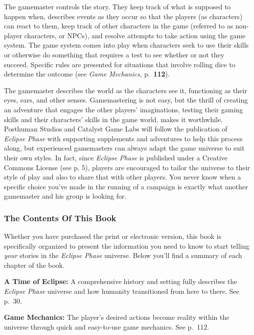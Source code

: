 The gamemaster controls the story. They keep track 
of what is supposed to happen when, describes events 
as they occur so that the players (as characters) can 
react to them, keep track of other characters in the 
game (referred to as non-player characters, or NPCs), 
and resolve attempts to take action using the game 
system. The game system comes into play when characters seek to use their skills or otherwise do something that requires a test to see whether or not they 
succeed. Specific rules are presented for situations that 
involve rolling dice to determine the outcome (see 
\textit{Game Mechanics,} p. \textbf{112}).

The gamemaster describes the world as the characters see it, functioning as their eyes, ears, and other 
senses. Gamemastering is not easy, but the thrill of 
creating an adventure that engages the other players' 
imaginations, testing their gaming skills and their 
characters' skills in the game world, makes it worthwhile. Posthuman Studios and Catalyst Game Labs 
will follow the publication of \textit{Eclipse Phase} with supporting supplements and adventures to help this process along, but experienced gamemasters can always 
adapt the game universe to suit their own styles. In 
fact, since \textit{Eclipse Phase} is published under a Creative 
Commons License (see p. 5), players are encouraged 
to tailor the universe to their style of play and also 
to share that with other players. You never know 
when a specific choice you've made in the running of 
a campaign is exactly what another gamemaster and 
his group is looking for.

\subsubsection{The Contents Of This Book}

Whether you have purchased the print or electronic 
version, this book is specifically organized to present 
the information you need to know to start telling 
\textit{your} stories in the \textit{Eclipse Phase} universe. Below 
you'll find a summary of each chapter of the book.

\textbf{A Time of Eclipse:} A comprehensive history and setting fully describes the \textit{Eclipse Phase} universe and how 
humanity transitioned from here to there. See p. 30.

\textbf{Game Mechanics:} The player's desired actions 
become reality within the universe through quick and 
easy-to-use game mechanics. See p. 112.

